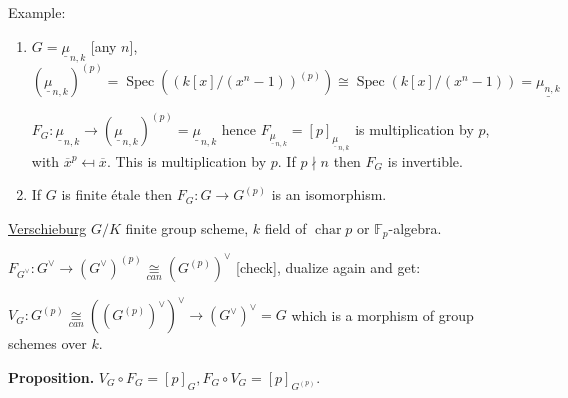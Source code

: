 \documentclass{article}
\theoremstyle{definition}
\numberwithin{theorem}{subsection}
\begin{document}
    Example:

    \begin{enumerate}[label=\arabic*)]
        \item \(G = \underline{\mu}_{n,k}\) [any \(n\)], \((\underline{\mu}_{n,k})^{(p)} = \operatorname{Spec}\left( \left( k[x] / (x^n - 1) \right) ^{(p)} \right) \cong \operatorname{Spec} \left( k[x] / (x^n - 1) \right) = \underline{\mu_{n,k}}\)
        
        \(F_G: \underline{\mu}_{n,k} \to (\underline{\mu}_{n,k})^{(p)} = \underline{\mu}_{n,k}\) hence \(F_{\underline{\mu}_{n,k}} = [p]_{\underline{\mu}_{n,k}}\) is multiplication by \(p\), with \(\overline{x}^p \mapsfrom \overline{x}\). This is multiplication by \(p\). If \(p\nmid n\) then \(F_G\) is invertible.
        
        \item If \(G\) is finite \'etale then \(F_G: G \to G^{(p)}\) is an isomorphism.
        
    \end{enumerate} 

    \underline{Verschieburg} \(G / K\) finite group scheme, \(k\) field of \(\operatorname{char} p\) or \(\mathbb{F}_p\)-algebra.
    
    \(F_{G^\vee}: G^\vee \to (G^\vee)^{(p)} \underset{can}{\cong} (G^{(p)})^\vee\) [check], dualize again and get:

    \(V_G: G^{(p)} \underset{can}{\cong} ((G^{(p)})^\vee)^\vee \to (G^\vee)^\vee = G\) which is a morphism of group schemes over \(k\).
    
    \textbf{Proposition.} \(V_G \circ F_G = [p]_G, F_G \circ V_G = [p]_{G^{(p)}}\).
\end{document}
